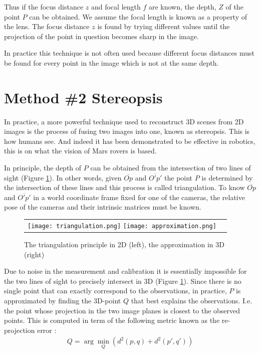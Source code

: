 \documentclass[twoside]{article}
\begin{document}
Thus if the focus distance $z$ and focal length $f$ are known, the depth, $Z$ of the point $P$ can be obtained. We assume the focal length is known as a property of the lens. The focus distance $z$ is found by trying different values until the projection of the point in question becomes sharp in the image.

In practice this technique is not often used because different focus distances must be found for every point in the image which is not at the same depth.

\section{Method \#2 Stereopsis}

In practice, a more powerful technique used to reconstruct 3D scenes from 2D images is the process of fusing two images into one, known as stereopsis. This is how humans see. And indeed it has been demonstrated to be effective in robotics, this is on what the vision of Mars rovers is based.

In principle, the depth of $P$ can be obtained from the intersection of two lines of sight (Figure \ref{triangle}). In other words, given $\overline{Op}$ and $\overline{O'p'}$ the point $P$ is determined by the intersection of these lines and this process is called triangulation. To know $\overline{Op}$ and $\overline{O'p'}$ in a  world coordinate frame fixed for one of the cameras, the relative pose of the cameras and their intrinsic matrices must be known.

\begin{figure}[h!]
  \begin{center}
	\begin{tabular}{cc}
	  \texttt{[image: triangulation.png]}
	  \texttt{[image: approximation.png]}
	\end{tabular}
  \end{center}
  \caption{The triangulation principle in 2D (left), the approximation in 3D (right)}
  \label{triangle}
\end{figure}

Due to noise in the measurement and calibration it is essentially impossible for the two lines of sight to precisely intersect in 3D (Figure \ref{triangle}). Since there is no single point that can exactly correspond to the observations, in practice, $P$ is approximated by finding the 3D-point $Q$ that best explains the observations. I.e. the point whose projection in the two image planes is closest to the observed points. This is computed in term of the following metric known as the re-projection error :
\begin{align}
Q = \arg\!\min_Q (d^2(p, q) + d^2(p', q'))
\end{align}
\end{document}
